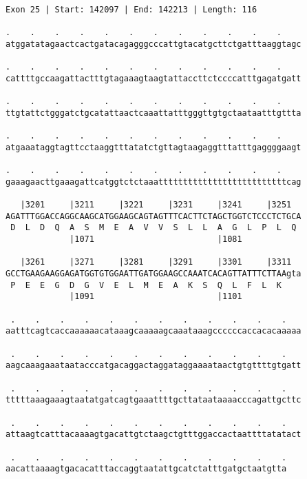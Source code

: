 \documentclass{article}
\begin{document}
\begin{Verbatim}
Exon 25 | Start: 142097 | End: 142213 | Length: 116
 
.    .    .    .    .    .    .    .    .    .    .    .    
atggatatagaactcactgatacagagggcccattgtacatgcttctgatttaaggtagc
  
.    .    .    .    .    .    .    .    .    .    .    .    
cattttgccaagattactttgtagaaagtaagtattaccttctccccatttgagatgatt
  
.    .    .    .    .    .    .    .    .    .    .    .    
ttgtattctgggatctgcatattaactcaaattatttgggttgtgctaataatttgttta
  
.    .    .    .    .    .    .    .    .    .    .    .    
atgaaataggtagttcctaaggtttatatctgttagtaagaggtttatttgaggggaagt
  
.    .    .    .    .    .    .    .    .    .    .    .    
gaaagaacttgaaagattcatggtctctaaattttttttttttttttttttttttttcag
  
   |3201     |3211     |3221     |3231     |3241     |3251  
AGATTTGGACCAGGCAAGCATGGAAGCAGTAGTTTCACTTCTAGCTGGTCTCCCTCTGCA
 D  L  D  Q  A  S  M  E  A  V  V  S  L  L  A  G  L  P  L  Q 
             |1071                         |1081            
  
   |3261     |3271     |3281     |3291     |3301     |3311  
GCCTGAAGAAGGAGATGGTGTGGAATTGATGGAAGCCAAATCACAGTTATTTCTTAAgta
 P  E  E  G  D  G  V  E  L  M  E  A  K  S  Q  L  F  L  K    
             |1091                         |1101            
  
 .    .    .    .    .    .    .    .    .    .    .    .   
aatttcagtcaccaaaaaacataaagcaaaaagcaaataaagccccccaccacacaaaaa
  
 .    .    .    .    .    .    .    .    .    .    .    .   
aagcaaagaaataatacccatgacaggactaggataggaaaataactgtgttttgtgatt
  
 .    .    .    .    .    .    .    .    .    .    .    .   
tttttaaagaaagtaatatgatcagtgaaattttgcttataataaaacccagattgcttc
  
 .    .    .    .    .    .    .    .    .    .    .    .   
attaagtcatttacaaaagtgacattgtctaagctgtttggaccactaattttatatact
  
 .    .    .    .    .    .    .    .    .    .    .    .
aacattaaaagtgacacatttaccaggtaatattgcatctatttgatgctaatgtta
\end{Verbatim}
\newpage
\end{document}
